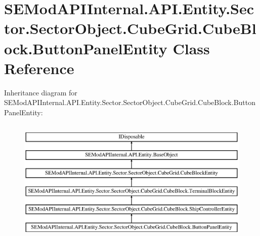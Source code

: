 \hypertarget{class_s_e_mod_a_p_i_internal_1_1_a_p_i_1_1_entity_1_1_sector_1_1_sector_object_1_1_cube_grid_1_182a07a9a51cd4f2f7a7f493193da48cf}{}\section{S\+E\+Mod\+A\+P\+I\+Internal.\+A\+P\+I.\+Entity.\+Sector.\+Sector\+Object.\+Cube\+Grid.\+Cube\+Block.\+Button\+Panel\+Entity Class Reference}
\label{class_s_e_mod_a_p_i_internal_1_1_a_p_i_1_1_entity_1_1_sector_1_1_sector_object_1_1_cube_grid_1_182a07a9a51cd4f2f7a7f493193da48cf}
Inheritance diagram for S\+E\+Mod\+A\+P\+I\+Internal.\+A\+P\+I.\+Entity.\+Sector.\+Sector\+Object.\+Cube\+Grid.\+Cube\+Block.\+Button\+Panel\+Entity\+:\begin{figure}[H]
\begin{center}
\leavevmode
\includegraphics[height=6.000000cm]{class_s_e_mod_a_p_i_internal_1_1_a_p_i_1_1_entity_1_1_sector_1_1_sector_object_1_1_cube_grid_1_182a07a9a51cd4f2f7a7f493193da48cf}
\end{center}
\end{figure}
